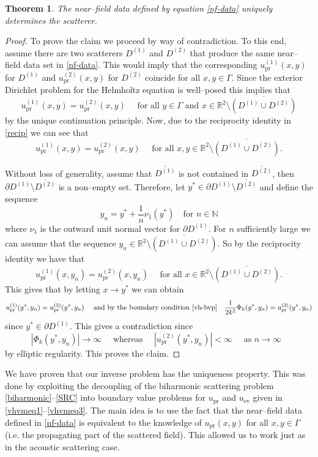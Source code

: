 \documentclass{article}
\newtheorem{theorem}{Theorem}[section]
\newcommand{\N}{\mathbb{N}}
\newcommand{\R}{\mathbb{R}}
\numberwithin{equation}{section}
\begin{document}
\begin{theorem} \label{ip-uniqueness}
The near--field data defined by equation \eqref{nf-data} uniquely determines the scatterer. 
\end{theorem}
\begin{proof}
To prove the claim we proceed by way of contradiction. To this end, assume there are two scatterers $D^{(1)}$ and $D^{(2)}$ that produce the same near--field data set in \eqref{nf-data}. This would imply that the corresponding $u_\textrm{pr}^{(1)} ( x , y )$ for $D^{(1)}$ and $u_\textrm{pr}^{(2)} ( x , y )$ for $D^{(2)}$ coincide for all $x,y \in \Gamma$. Since the exterior Dirichlet problem for the Helmholtz equation is well--posed this implies that 
$$u_\textrm{pr}^{(1)} ( x , y ) = u_\textrm{pr}^{(2)} ( x , y ) \quad \text{ for all $y\in \Gamma$ and $x \in \R^2 \setminus \overline{(D^{(1)} \cup D^{(2)})}$}$$
by the unique continuation principle. Now, due to the reciprocity identity in \eqref{recip} we can see that 
$$u_\textrm{pr}^{(1)} ( x , y ) = u_\textrm{pr}^{(2)} ( x , y ) \quad \text{ for all $x,y \in \R^2 \setminus \overline{(D^{(1)} \cup D^{(2)})}$}.$$

Without loss of generality, assume that $\overline{D^{(1)}}$ is not contained in $\overline{D^{(2)}}$, then $\partial D^{(1)} \setminus \overline{D^{(2)}}$ is a non--empty set. Therefore, let $y^* \in \partial D^{(1)} \setminus \overline{D^{(2)}}$ and define the sequence 
$$y_n = y^* + \frac{1}{n} \nu_1(y^*)  \quad \text{for $n \in \N$} $$ 
where $\nu_1$ is the outward unit normal vector for $\partial D^{(1)}$. For $n$ sufficiently large we can assume that the sequence $y_n \in \R^2 \setminus \overline{(D^{(1)} \cup D^{(2)})}$. So by the reciprocity identity we have that
$$u_\textrm{pr}^{(1)} ( x , y_n ) = u_\textrm{pr}^{(2)} ( x , y_n ) \quad \text{ for all $x \in \R^2 \setminus \overline{(D^{(1)} \cup D^{(2)})}$}.$$
This gives that by letting $x \to y^*$ we can obtain
$$ u_\textrm{pr}^{(1)} ( y^* , y_n ) = u_\textrm{pr}^{(2)} ( y^* , y_n )  \quad \text{ and by the boundary condition \eqref{vh-bvp}} \quad \frac{1}{2k^2} \Phi_k ( y^* , y_n ) = u_\textrm{pr}^{(2)} ( y^* , y_n )$$
since $y^* \in \partial D^{(1)}$. This gives a contradiction since 
$$ |\Phi_k ( y^* , y_n )| \to \infty  \quad \text{ whereas } \quad |u_\textrm{pr}^{(2)} ( y^* , y_n )| < \infty  \quad \text{ as $n \to \infty$ }$$
by elliptic regularity. This proves the claim. 
\end{proof}


We have proven that our inverse problem has the uniqueness property. This was done by exploiting the decoupling of the biharmonic scattering problem \eqref{biharmonic}--\eqref{SRC} into boundary value problems for $u_\textrm{pr}$ and $u_\textrm{ev}$ given in \eqref{vhvmeq1}--\eqref{vhvmeq3}. The main idea is to use the fact that the near--field data defined in \eqref{nf-data} is equivalent to the knowledge of $u_\textrm{pr}(x,y)$ for all $x,y \in \Gamma$ (i.e. the propagating part of the scattered field). This allowed us to work just as in the acoustic scattering case. 
\end{document}
